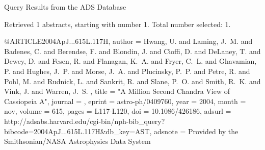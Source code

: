 Query Results from the ADS Database


Retrieved 1 abstracts, starting with number 1.  Total number selected: 1.

@ARTICLE{2004ApJ...615L.117H,
   author = {{Hwang}, U. and {Laming}, J.~M. and {Badenes}, C. and {Berendse}, F. and 
	{Blondin}, J. and {Cioffi}, D. and {DeLaney}, T. and {Dewey}, D. and 
	{Fesen}, R. and {Flanagan}, K.~A. and {Fryer}, C.~L. and {Ghavamian}, P. and 
	{Hughes}, J.~P. and {Morse}, J.~A. and {Plucinsky}, P.~P. and 
	{Petre}, R. and {Pohl}, M. and {Rudnick}, L. and {Sankrit}, R. and 
	{Slane}, P.~O. and {Smith}, R.~K. and {Vink}, J. and {Warren}, J.~S.
	},
    title = "{A Million Second Chandra View of Cassiopeia A}",
  journal = {\apjl},
   eprint = {astro-ph/0409760},
     year = 2004,
    month = nov,
   volume = 615,
    pages = {L117-L120},
      doi = {10.1086/426186},
   adsurl = {http://adsabs.harvard.edu/cgi-bin/nph-bib_query?bibcode=2004ApJ...615L.117H&db_key=AST},
  adsnote = {Provided by the Smithsonian/NASA Astrophysics Data System}
}


